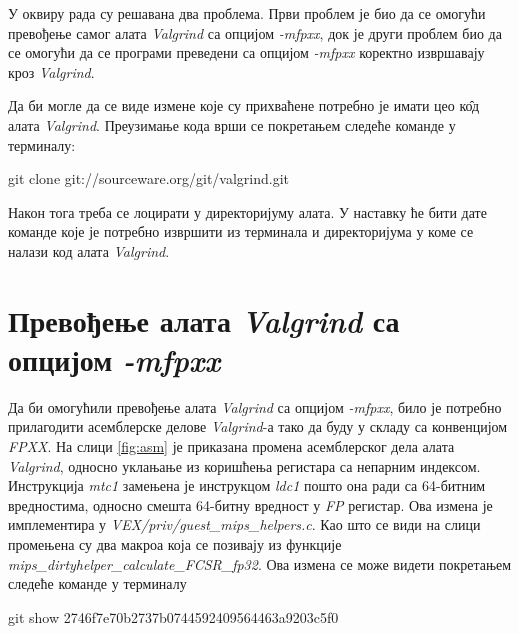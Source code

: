 \documentclass[12pt,oneside]{memoir}
\begin{document}
\indent У оквиру рада су решавана два проблема. Први проблем је био да се омогући превођење самог алата \textit{Valgrind} са опцијом \textit{-mfpxx}, док је други проблем био да се омогући да се програми преведени са опцијом \textit{-mfpxx} коректно извршавају кроз \textit{Valgrind}.

\indent Да би могле да се виде измене које су прихваћене потребно је имати цео к\^{о}д алата \textit{Valgrind}. Преузимање кода врши се покретањем следеће команде у терминалу:

\begin{center}
git clone git://sourceware.org/git/valgrind.git
\end{center}

Након тога треба се лоцирати у директоријуму алата. У наставку ће бити дате команде које је потребно извршити из терминала и директоријума у коме се налази код алата \textit{Valgrind}.

\section{Превођење алата \textit{Valgrind} са опцијом \textit{-mfpxx}}

\indent Да би омогућили превођење алата \textit{Valgrind} са опцијом \textit{-mfpxx}, било је потребно прилагодити асемблерске делове \textit{Valgrind}-а тако да буду у складу са конвенцијом \textit{FPXX}. На слици \ref{fig:asm} је приказана промена асемблерског дела алата \textit{Valgrind}, односно уклањање из коришћења регистара са непарним индексом. Инструкција \textit{mtc1} замењена је инструкцом \textit{ldc1} пошто она ради са 64-битним вредностима, односно смешта 64-битну вредност у \textit{FP} регистар. Ова измена је имплементира у \textit{VEX/priv/guest\_mips\_helpers.c}. Као што се види на слици промењена су два макроа која се позивају из функције \textit{mips\_dirtyhelper\_\-calculate\_FCSR\_fp32}. Ова измена се може видети покретањем следеће команде у терминалу

\begin{center}
git show 2746f7e70b2737b0744592409564463a9203c5f0
\end{center}
\end{document}
